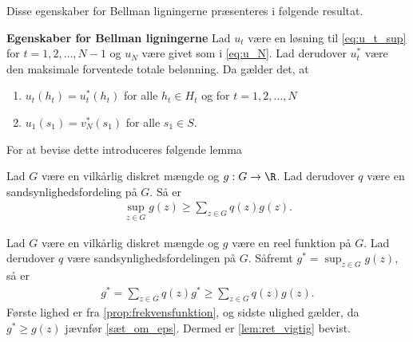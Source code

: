 Disse egenskaber for Bellman ligningerne præsenteres i følgende resultat.

\begin{minipage}\textwidth
\begin{thmx} \textbf{Egenskaber for Bellman ligningerne} \label{sæt:ret_så_vigtig}%
\newline
Lad $u_t$ være en løsning til \eqref{eq:u_t_sup} for $t = 1, 2, \ldots, N-1$ og $u_N$ være givet som i \eqref{eq:u_N}. Lad derudover $u_t^*$ være den maksimale forventede totale belønning. Da gælder det, at
\begin{enumerate}
    \item $u_t(h_t)=u_t^*(h_t)$ for alle $h_t\in H_t$ og for $t=1, 2,\ldots, N$
    \item $u_1(s_1)=v_N^*(s_1)$ for alle $s_1\in S$.
\end{enumerate}
\end{thmx}
\end{minipage}

For at bevise dette introduceres følgende lemma

\begin{minipage}\textwidth
\begin{lem} \label{lem:ret_vigtig}\textbf{} %
\newline
Lad $G$ være en vilkårlig diskret mængde og $g: G\to \R$. Lad derudover $q$ være en sandsynlighedsfordeling på $G$. Så er
\begin{align*}
    \sup_{z\in G}g(z)\geq \sum_{z\in G}q(z) g(z).
\end{align*}
\end{lem}
\end{minipage}

\begin{bev} \textbf{} %
\newline
Lad $G$ være en vilkårlig diskret mængde og $g$ være en reel funktion på $G$. Lad derudover $q$ være sandsynlighedsfordelingen på $G$. Såfremt $\displaystyle g^*=\sup_{z\in G}g(z)$, så er 
\begin{align*}
    g^* = \sum_{z \in G} q(z)g^* \geq \sum_{z \in G} q(z)g(z).
\end{align*}
Første lighed er fra \autoref{prop:frekvensfunktion}, og sidste ulighed gælder, da $g^* \geq g(z)$ jævnfør \autoref{sæt_om_eps}. Dermed er \autoref{lem:ret_vigtig} bevist.
\end{bev}

